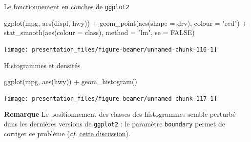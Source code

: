 \documentclass[12pt,handout,ignorenonframetext,]{beamer}
\newenvironment{Shaded}{}{}
\newcommand{\KeywordTok}[1]{\textcolor[rgb]{0.00,0.00,1.00}{{#1}}}
\newcommand{\DataTypeTok}[1]{{#1}}
\newcommand{\StringTok}[1]{\textcolor[rgb]{0.00,0.50,0.50}{{#1}}}
\newcommand{\OtherTok}[1]{\textcolor[rgb]{1.00,0.25,0.00}{{#1}}}
\newcommand{\NormalTok}[1]{{#1}}
\renewenvironment{Shaded}{\begin{snugshade}}{\end{snugshade}}
\begin{document}
\begin{frame}[fragile]{\large Le fonctionnement en \og couches \fg{} de
\texttt{ggplot2}}

\footnotesize \center

\begin{Shaded}
\begin{Highlighting}[]
\KeywordTok{ggplot}\NormalTok{(mpg, }\KeywordTok{aes}\NormalTok{(displ, hwy)) +}\StringTok{ }
\StringTok{  }\KeywordTok{geom_point}\NormalTok{(}\KeywordTok{aes}\NormalTok{(}\DataTypeTok{shape =} \NormalTok{drv), }\DataTypeTok{colour =} \StringTok{"red"}\NormalTok{) +}\StringTok{ }
\StringTok{  }\KeywordTok{stat_smooth}\NormalTok{(}\KeywordTok{aes}\NormalTok{(}\DataTypeTok{colour =} \NormalTok{class), }\DataTypeTok{method =} \StringTok{"lm"}\NormalTok{, }\DataTypeTok{se =} \OtherTok{FALSE}\NormalTok{)}
\end{Highlighting}
\end{Shaded}

\texttt{[image: presentation\_files/figure-beamer/unnamed-chunk-116-1]}

\end{frame}

\begin{frame}[fragile]{Histogrammes et densités}

\footnotesize \center

\vspace{-0.3cm}

\begin{Shaded}
\begin{Highlighting}[]
\KeywordTok{ggplot}\NormalTok{(mpg, }\KeywordTok{aes}\NormalTok{(hwy)) +}\StringTok{ }\KeywordTok{geom_histogram}\NormalTok{()}
\end{Highlighting}
\end{Shaded}

\texttt{[image: presentation\_files/figure-beamer/unnamed-chunk-117-1]}

\pause \raggedright \small \vspace{-0.3cm}

\textbf{Remarque} Le positionnement des classes des histogrammes semble
perturbé dans les dernières versions de \texttt{ggplot2} : le paramètre
\texttt{boundary} permet de corriger ce problème (\emph{cf.}
\href{http://stackoverflow.com/questions/37876096/geom-histogram-wrong-bins}{\underline{cette discussion}}).

\end{frame}
\end{document}
